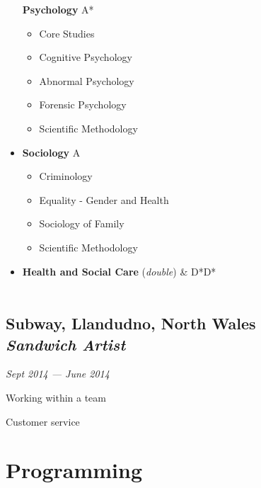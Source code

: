 \documentclass[a4paper, 13pt, draft]{article}
\newcommand{\timeperiod}[2]{%
    \textit{\small{#1 --- #2}}
}
\begin{document}
\begin{multicols}{2}
\begin{itemize}
	\textbf{Psychology} A*

	\begin{itemize}		
	    \setlength\itemsep{0em}
	\item Core Studies
	\item Cognitive Psychology
	\item Abnormal Psychology
	\item Forensic Psychology
	\item Scientific Methodology 

    \end{itemize}		

\item 
    \textbf{Sociology} A

    \begin{itemize}		
	\setlength\itemsep{0em}
    \item Criminology
    \item Equality - Gender and Health
    \item Sociology of Family
    \item Scientific Methodology
\end{itemize}		

\item 
    \textbf{Health and Social Care} (\textit{double}) & D*D* \\ \\

\end{itemize}		
\end{multicols}

\subsection*{Subway, \small{Llandudno, North Wales} \\\emph{Sandwich Artist}} \timeperiod{Sept 2014}{June 2014}

\begin{itemize}		
    \begin{multicols}{3}
    \item Working within a team
    \item Customer service
    \end{multicols}
\end{itemize}		

\section*{\color{col1} \Large{Programming} \color{default}} 
\end{document}
